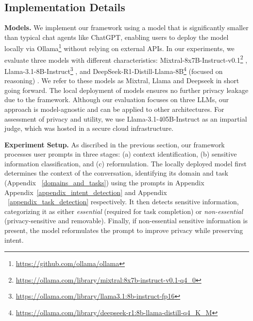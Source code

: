 \subsection{Implementation Details}
\textbf{Models.} We implement our framework using a model that is significantly smaller than typical chat agents like ChatGPT, enabling users to deploy the model locally via Ollama\footnote{\url{https://github.com/ollama/ollama}} without relying on external APIs.
In our experiments, we evaluate three models with different characteristics: Mixtral-8x7B-Instruct-v0.1\footnote{\url{https://ollama.com/library/mixtral:8x7b-instruct-v0.1-q4\_0}} \cite{jiang2024mixtralexperts}, Llama-3.1-8B-Instruct\footnote{\url{https://ollama.com/library/llama3.1:8b-instruct-fp16}} \cite{grattafiori2024llama3herdmodels}, 
and DeepSeek-R1-Distill-Llama-8B\footnote{\url{https://ollama.com/library/deepseek-r1:8b-llama-distill-q4_K_M}} (focused on reasoning) \cite{deepseekai2025deepseekr1}. We refer to these models as Mixtral, Llama and Deepseek in short going forward.
The local deployment of models ensures no further privacy leakage due to the framework. Although our evaluation focuses on three LLMs, our approach is model-agnostic and can be applied to other architectures. For assessment of privacy and utility, we use Llama-3.1-405B-Instruct \cite{grattafiori2024llama3herdmodels} as an impartial judge, which was hosted in a secure cloud infrastructure.

\textbf{Experiment Setup.} 
As discribed in the previous section,
our framework processes user prompts in three stages: (a) context identification, (b) sensitive information classification, and (c) reformulation. The locally deployed model first determines the context of the conversation, identifying its domain and task (Appendix ~\ref{domains_and_tasks}) using the prompts in Appendix Appendix~\ref{appendix_intent_detection} and Appendix ~\ref{appendix_task_detection} respectively. It then detects sensitive information, categorizing it as either \textit{essential} (required for task completion) or \textit{non-essential} (privacy-sensitive and removable). Finally, if non-essential sensitive information is present, the model reformulates the prompt to improve privacy while preserving intent.

